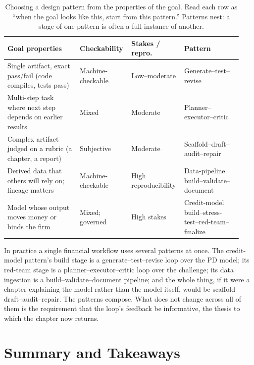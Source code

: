 \begin{table}[t]
\centering
\caption{Choosing a design pattern from the properties of the goal. Read each row
as ``when the goal looks like this, start from this pattern.'' Patterns nest:
a stage of one pattern is often a full instance of another.}
\label{tab:pattern-choice}
\small
\setlength{\tabcolsep}{4pt}
\begin{tabular}{@{}p{0.30\linewidth}p{0.20\linewidth}p{0.20\linewidth}p{0.24\linewidth}@{}}
\toprule
\textbf{Goal properties} & \textbf{Checkability} & \textbf{Stakes / repro.} & \textbf{Pattern} \\
\midrule
Single artifact, exact pass/fail (code compiles, tests pass) &
Machine-checkable & Low--moderate &
Generate--test--revise \\
\addlinespace
Multi-step task where next step depends on earlier results &
Mixed & Moderate &
Planner--executor--critic \\
\addlinespace
Complex artifact judged on a rubric (a chapter, a report) &
Subjective & Moderate &
Scaffold--draft--audit--repair \\
\addlinespace
Derived data that others will rely on; lineage matters &
Machine-checkable & High reproducibility &
Data-pipeline build--validate--document \\
\addlinespace
Model whose output moves money or binds the firm &
Mixed; governed & High stakes &
Credit-model build--stress-test--red-team--finalize \\
\bottomrule
\end{tabular}
\end{table}

In practice a single financial workflow uses several patterns at once. The
credit-model pattern's build stage is a generate--test--revise loop over the PD
model; its red-team stage is a planner--executor--critic loop over the
challenge; its data ingestion is a build--validate--document pipeline; and the
whole thing, if it were a chapter explaining the model rather than the model
itself, would be scaffold--draft--audit--repair. The patterns compose. What does
not change across all of them is the requirement that the loop's feedback be
informative, the thesis to which the chapter now returns.

\section{Summary and Takeaways}\label{sec:loops-summary}

